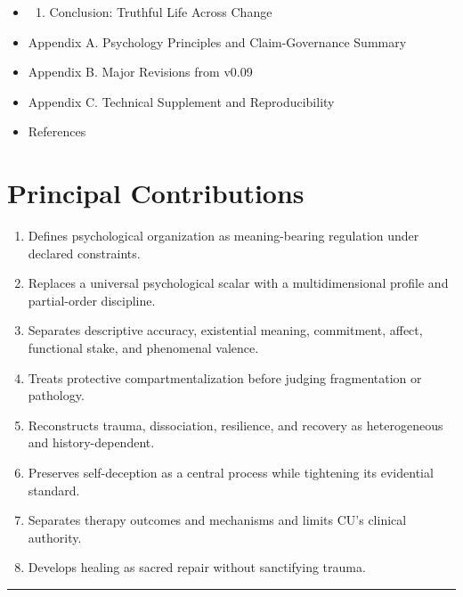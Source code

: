 \documentclass[
  11pt,
]{article}
\providecommand{\tightlist}{%
  \setlength{\itemsep}{0pt}\setlength{\parskip}{0pt}}
\begin{document}
\begin{itemize}
\begin{enumerate}
  \def\labelenumi{\arabic{enumi}.}
  \setcounter{enumi}{13}
  \tightlist
  \item
    What Commitments This Account Licenses
  \end{enumerate}
\item
  \begin{enumerate}
  \def\labelenumi{\arabic{enumi}.}
  \setcounter{enumi}{14}
  \tightlist
  \item
    Conclusion: Truthful Life Across Change
  \end{enumerate}
\item
  Appendix A. Psychology Principles and Claim-Governance Summary
\item
  Appendix B. Major Revisions from v0.09
\item
  Appendix C. Technical Supplement and Reproducibility
\item
  References
\end{itemize}

\section{Principal Contributions}\label{principal-contributions}

\begin{enumerate}
\def\labelenumi{\arabic{enumi}.}
\tightlist
\item
  Defines psychological organization as meaning-bearing regulation under
  declared constraints.
\item
  Replaces a universal psychological scalar with a multidimensional
  profile and partial-order discipline.
\item
  Separates descriptive accuracy, existential meaning, commitment,
  affect, functional stake, and phenomenal valence.
\item
  Treats protective compartmentalization before judging fragmentation or
  pathology.
\item
  Reconstructs trauma, dissociation, resilience, and recovery as
  heterogeneous and history-dependent.
\item
  Preserves self-deception as a central process while tightening its
  evidential standard.
\item
  Separates therapy outcomes and mechanisms and limits CU's clinical
  authority.
\item
  Develops healing as sacred repair without sanctifying trauma.
\end{enumerate}

\begin{center}\rule{0.5\linewidth}{0.5pt}\end{center}
\end{document}
